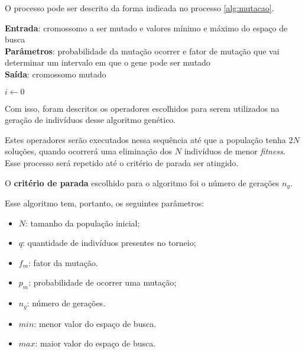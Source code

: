 \documentclass[a4paper, 12pt]{article}
\newenvironment{brprocess}[1][]
  {\begin{algorithm}[#1]
     \selectlanguage{brazilian}%
     \floatname{algorithm}{Processo}%
     \renewcommand{\algorithmicif}{\textbf{se}}%
     \renewcommand{\algorithmicfor}{\textbf{para}}%
     \renewcommand{\algorithmicdo}{\textbf{faça}}%
     \renewcommand{\algorithmicthen}{\textbf{faça}}%
     \renewcommand{\algorithmicend}{\textbf{fim}}%
     \renewcommand{\algorithmicwhile}{\textbf{enquanto}}%
     \renewcommand{\algorithmicelse}{\textbf{caso contrário}}%
  }
  {\end{algorithm}}
\begin{document}
O processo pode ser descrito da forma indicada no processo \ref{alg:mutacao}.
\begin{brprocess}[!ht]
    \cprotect\caption{Operador de mutação (\verb|mutacao_uniforme(cromossomo,|
    \verb|p_mutacao,|\verb|f_mutacao,| \verb|min,| \verb|max|)}
    \textbf{Entrada}: cromossomo a ser mutado e valores mínimo e máximo do espaço de busca\\
    \textbf{Parâmetros}: probabilidade da mutação ocorrer e fator de mutação que vai determinar um intervalo em que o gene pode ser mutado\\
    \textbf{Saída}: cromossomo mutado
    \begin{algorithmic}
        \State $i \gets 0$
                \EndIf
                \EndIf
            \EndIf
        \EndFor
    \end{algorithmic}
    \label{alg:mutacao}
\end{brprocess}

Com isso, foram descritos os operadores escolhidos para serem utilizados na geração de indivíduos desse algoritmo genético.

Estes operadores serão executados nessa sequência até que a população tenha $2N$ soluções, quando ocorrerá uma eliminação dos $N$ indivíduos de menor \textit{fitness}. Esse processo será repetido até o critério de parada ser atingido. 

O \textbf{critério de parada} escolhido para o algoritmo foi o número de gerações $n_g$. 

Esse algoritmo tem, portanto, os seguintes parâmetros:
\begin{itemize}
    \item $N$: tamanho da população inicial;
    \item $q$: quantidade de indivíduos presentes no torneio;
    \item $f_m$: fator da mutação.
    \item $p_m$: probabilidade de ocorrer uma mutação;
    \item $n_g$: número de gerações.
    \item $min$: menor valor do espaço de busca.
    \item $max$: maior valor do espaço de busca.
\end{itemize}
\end{document}
